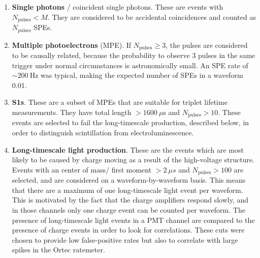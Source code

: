 \begin{enumerate}
    \item \textbf{Single photons} / coincident single photons. These are events with $N_\mathrm{pulses}< M$. They are considered to be accidental coincidences and counted as $N_\mathrm{pulses}$ SPEs.
    \item \textbf{Multiple photoelectrons} (MPE). 
    If $N_\mathrm{pulses} \geq 3$, the pulses are considered to be causally related, because the probability to observe $3$ pulses in the same trigger under normal circumstances is astronomically small.
    An SPE rate of $\sim200~\mathrm{Hz}$ was typical, making the expected number of SPEs in a waveform 0.01.
    \item \textbf{S1s}.
    These are a subset of MPEs that are suitable for triplet lifetime measurements. 
    They have total length  $> 1600~\mu \mathrm{s}$ and $N_\mathrm{pulses} > 10$.
    These events are selected to fail the long-timescale production, described below, in order to distinguish scintillation from electroluminescence. 
    \item \textbf{Long-timescale light production}.
    These are the events which are most likely to be caused by charge moving as a result of the high-voltage structure.
    Events with an center of mass/ first moment  $>2~\mu s$ and $N_\mathrm{pulses} > 100$ are selected, and are considered on a waveform-by-waveform basis. 
    This means that there are a maximum of one long-timescale light event per waveform.
    This is motivated by the fact that the charge amplifiers respond slowly, and in those channels only one charge event can be counted per waveform. 
    The presence of long-timescale light events in a PMT channel are compared to the presence of charge events in order to look for correlations.
    These cuts were chosen to provide low false-positive rates but also to correlate with large spikes in the Ortec ratemeter.
  

\end{enumerate}
